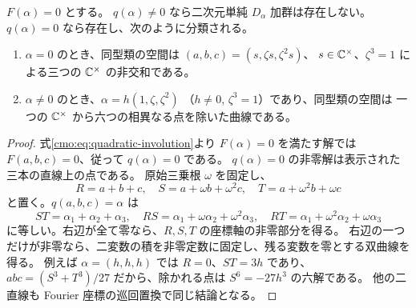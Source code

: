 \begin{corollary}[退化係数を含む存在条件]
\label{cmo:cor:two-dimensional-boundary}
$F(\alpha)=0$ とする。
$q(\alpha)\ne0$ なら二次元単純 $D_\alpha$ 加群は存在しない。
$q(\alpha)=0$ なら存在し、次のように分類される。
\begin{enumerate}
\item $\alpha=0$ のとき、同型類の空間は
$(a,b,c)=(s,\zeta s,\zeta^2s)$、
$s\in\mathbb C^\times$、$\zeta^3=1$ による三つの $\mathbb C^\times$ の非交和である。
\item $\alpha\ne0$ のとき、$\alpha=h(1,\zeta,\zeta^2)$
（$h\ne0$, $\zeta^3=1$）であり、同型類の空間は
一つの $\mathbb C^\times$ から六つの相異なる点を除いた曲線である。
\end{enumerate}
\end{corollary}

\begin{proof}
式\eqref{cmo:eq:quadratic-involution}より
$F(\alpha)=0$ を満たす解では $F(a,b,c)=0$、従って $q(\alpha)=0$ である。
$q(\alpha)=0$ の非零解は表示された三本の直線上の点である。
原始三乗根 $\omega$ を固定し、
\[
 R=a+b+c,\quad S=a+\omega b+\omega^2c,\quad
 T=a+\omega^2b+\omega c
\]
と置く。$q(a,b,c)=\alpha$ は
\[
 ST=\alpha_1+\alpha_2+\alpha_3,\quad
 RS=\alpha_1+\omega\alpha_2+\omega^2\alpha_3,\quad
 RT=\alpha_1+\omega^2\alpha_2+\omega\alpha_3
\]
に等しい。右辺が全て零なら、$R,S,T$ の座標軸の非零部分を得る。
右辺の一つだけが非零なら、二変数の積を非零定数に固定し、残る変数を零とする双曲線を得る。
例えば $\alpha=(h,h,h)$ では $R=0$、$ST=3h$ であり、
$abc=(S^3+T^3)/27$ だから、除かれる点は $S^6=-27h^3$ の六解である。
他の二直線も Fourier 座標の巡回置換で同じ結論となる。
\end{proof}

